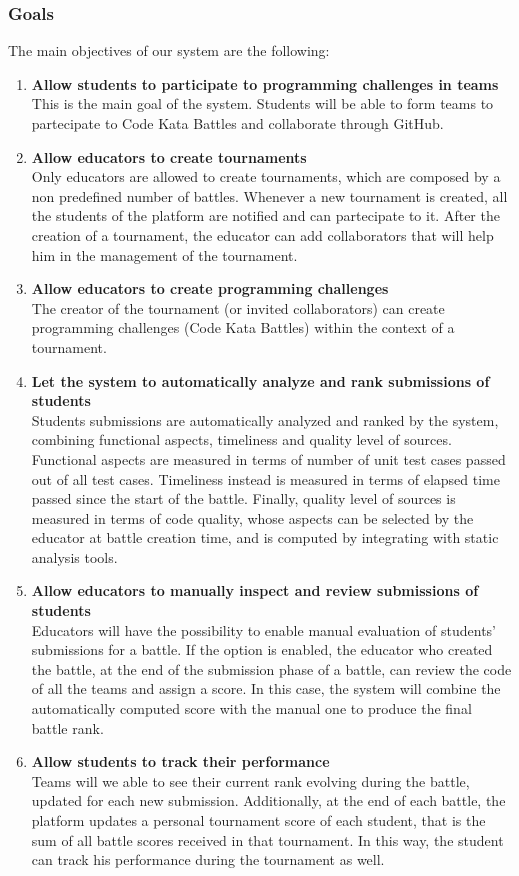  \subsubsection{Goals}
 \label{goals}
 The main objectives of our system are the following:
 \begin{enumerate}[label=$\bullet$ \textbf{G\arabic*:}]
     \item \textbf{ Allow students to participate to programming challenges in teams}\\This is the main goal of the system. Students will be able to form teams to partecipate to Code Kata Battles and collaborate through GitHub.
     \item \textbf{ Allow educators to create tournaments}\\Only educators are allowed to create tournaments, which are composed by a non predefined number of battles. Whenever a new tournament is created, all the students of the platform are notified and can partecipate to it. After the creation of a tournament, the educator can add collaborators that will help him in the management of the tournament.
     \item \textbf{ Allow educators to create programming challenges}\\The creator of the tournament (or invited collaborators) can create programming challenges (Code Kata Battles) within the context of a tournament.
     \item \textbf{ Let the system to automatically analyze and rank submissions of students}\\Students submissions are automatically analyzed and ranked by the system, combining functional aspects, timeliness and quality level of sources. Functional aspects are measured in terms of number of unit test cases passed out of all test cases. Timeliness instead is measured in terms of elapsed time passed since the start of the battle. Finally, quality level of sources is measured in terms of code quality, whose aspects can be selected by the educator at battle creation time, and is computed by integrating with static analysis tools.
     \item \textbf{ Allow educators to manually inspect and review submissions of students}\\Educators will have the possibility to enable manual evaluation of students' submissions for a battle. If the option is enabled, the educator who created the battle, at the end of the submission phase of a battle, can review the code of all the teams and assign a score. In this case, the system will combine the automatically computed score with the manual one to produce the final battle rank.
     \item \textbf{ Allow students to track their performance}\\Teams will we able to see their current rank evolving during the battle, updated for each new submission. Additionally, at the end of each battle, the platform updates a personal tournament score of each student, that is the sum of all battle scores received in that tournament. In this way, the student can track his performance during the tournament as well.
 \end{enumerate}
\newpage
